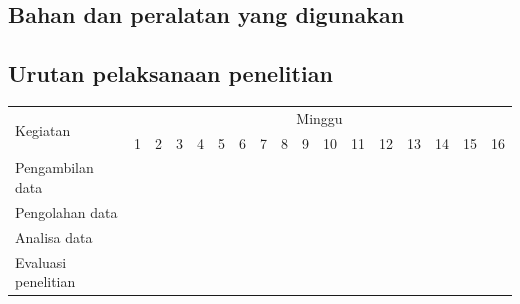 \subsection{Bahan dan peralatan yang digunakan}

\lipsum[13]

\subsection{Urutan pelaksanaan penelitian}

\newcommand{\w}{}
\newcommand{\G}{\cellcolor{gray}}
\begin{table}[h!]
  \begin{tabular}{|p{3.5cm}|c|c|c|c|c|c|c|c|c|c|c|c|c|c|c|c|}

    \hline
    \multirow{2}{*}{Kegiatan} & \multicolumn{16}{|c|}{Minggu} \\
    \cline{2-17} &
    1 & 2 & 3 & 4 & 5 & 6 & 7 & 8 & 9 & 10 & 11 & 12 & 13 & 14 & 15 & 16 \\
    \hline

    Pengambilan data &
    \G & \G & \G & \G & \w & \w & \w & \w & \w & \w & \w & \w & \w & \w & \w & \w \\
    \hline

    Pengolahan data &
    \w & \w & \w & \w & \G & \G & \G & \G & \w & \w & \w & \w & \w & \w & \w & \w \\
    \hline

    Analisa data &
    \w & \w & \w & \w & \w & \w & \w & \w & \G & \G & \G & \G & \w & \w & \w & \w \\
    \hline

    Evaluasi penelitian &
    \w & \w & \w & \w & \w & \w & \w & \w & \w & \w & \w & \w & \G & \G & \G & \G \\
    \hline

  \end{tabular}
\end{table}